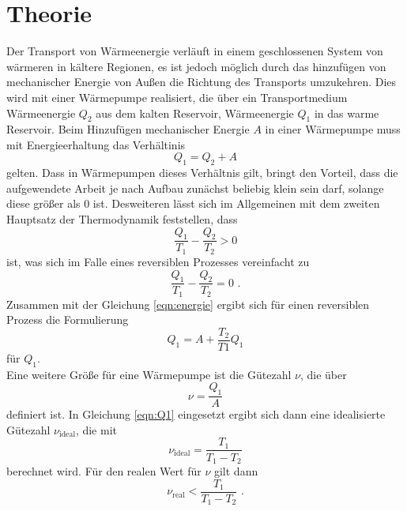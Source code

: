\section{Theorie \cite{V206}}
\label{sec:Theorie}

Der Transport von Wärmeenergie verläuft in einem geschlossenen System von wärmeren in kältere Regionen, es ist jedoch möglich
durch das hinzufügen von mechanischer Energie von Außen die Richtung des Transports umzukehren. Dies wird mit einer 
Wärmepumpe realisiert, die über ein Transportmedium Wärmeenergie $Q_2$ aus dem kalten Reservoir, Wärmeenergie $Q_1$ in das 
warme Reservoir. Beim Hinzufügen mechanischer Energie $A$ in einer Wärmepumpe muss mit Energieerhaltung das Verhältinis
\begin{equation}
    Q_1=Q_2+A
    \label{eqn:energie}
\end{equation}
gelten. Dass in Wärmepumpen dieses Verhältnis gilt, bringt den Vorteil, dass die aufgewendete Arbeit je nach Aufbau zunächst beliebig
klein sein darf, solange diese größer als 0 ist.
Desweiteren lässt sich im Allgemeinen mit dem zweiten Hauptsatz der Thermodynamik feststellen, dass
\begin{equation}
    \frac{Q_1}{T_1}-\frac{Q_2}{T_2}>0
\end{equation}
ist, was sich im Falle eines reversiblen Prozesses vereinfacht zu
\begin{equation}
    \frac{Q_1}{T_1}-\frac{Q_2}{T_2}=0 \text{ .}
\end{equation}
Zusammen mit der Gleichung \ref{eqn:energie} ergibt sich für einen reversiblen Prozess die Formulierung
\begin{equation}
    Q_1=A+\frac{T_2}{T1}Q_1
    \label{eqn:Q1}
\end{equation}
für $Q_1$.\\
\noindent Eine weitere Größe für eine Wärmepumpe ist die Gütezahl $\nu$, die über
\begin{equation}
    \nu=\frac{Q_1}{A}
    \label{eqn:güte}
\end{equation}
definiert ist. In Gleichung \ref{eqn:Q1} eingesetzt ergibt sich dann eine idealisierte Gütezahl $\nu_{\mathrm{ideal}}$, die mit
\begin{equation}
    \nu_{\mathrm{ideal}}=\frac{T_1}{T_1-T_2}
    \label{eqn:güteideal}
\end{equation}
berechnet wird. Für den realen Wert für $\nu$ gilt dann
\begin{equation}
    \nu_{\mathrm{real}}<\frac{T_1}{T_1-T_2} \text{ .}
\end{equation}
